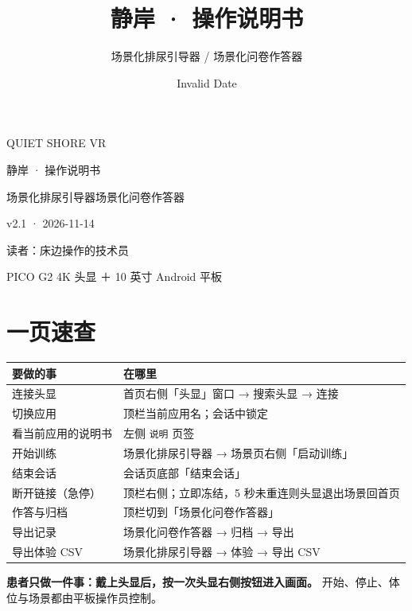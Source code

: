 \documentclass[
  chinese,
  letterpaper,
  DIV=11,
  numbers=noendperiod]{scrartcl}
\title{静岸 · 操作说明书}
\subtitle{场景化排尿引导器 / 场景化问卷作答器}
\author{}
\date{Invalid Date}
\newcounter{none} %
\begin{document}
\maketitle


QUIET SHORE VR

静岸 · 操作说明书

场景化排尿引导器场景化问卷作答器

v2.1 · 2026-11-14

读者：床边操作的技术员

PICO G2 4K 头显 ＋ 10 英寸 Android 平板

\section{一页速查}\label{ux4e00ux9875ux901fux67e5}

{\def\LTcaptype{none} %
\begin{longtable}[]{@{}
  >{\raggedright\arraybackslash}p{}
  >{\raggedright\arraybackslash}p{}@{}}
\toprule\noalign{}
\begin{minipage}[b]{\linewidth}\raggedright
要做的事
\end{minipage} & \begin{minipage}[b]{\linewidth}\raggedright
在哪里
\end{minipage} \\
\midrule\noalign{}
\endhead
\bottomrule\noalign{}
\endlastfoot
连接头显 & 首页右侧「头显」窗口 → 搜索头显 → 连接 \\
切换应用 & 顶栏当前应用名；会话中锁定 \\
看当前应用的说明书 & 左侧 \texttt{说明} 页签 \\
开始训练 & 场景化排尿引导器 → 场景页右侧「启动训练」 \\
结束会话 & 会话页底部「结束会话」 \\
断开链接（急停） & 顶栏右侧；立即冻结，5 秒未重连则头显退出场景回首页 \\
作答与归档 & 顶栏切到「场景化问卷作答器」 \\
导出记录 & 场景化问卷作答器 → 归档 → 导出 \\
导出体验 CSV & 场景化排尿引导器 → 体验 → 导出 CSV \\
\end{longtable}
}

\textbf{患者只做一件事：戴上头显后，按一次头显右侧按钮进入画面。}
开始、停止、体位与场景都由平板操作员控制。
\end{document}
